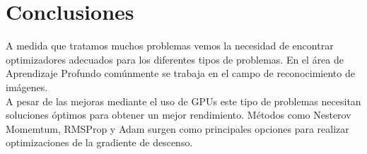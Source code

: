 \section{Conclusiones}
A medida que tratamos muchos problemas vemos la necesidad de encontrar optimizadores adecuados para los diferentes tipos de problemas. En el área de Aprendizaje Profundo comúnmente se trabaja en el campo de reconocimiento de imágenes.\\ A pesar de las mejoras mediante el uso de GPUs este tipo de problemas necesitan soluciones óptimos para obtener un mejor rendimiento. Métodos como Nesterov Momemtum, RMSProp y Adam surgen como principales opciones para realizar optimizaciones de la gradiente de descenso.

